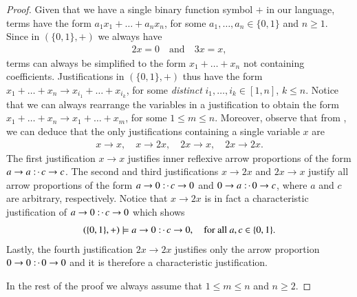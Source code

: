 \documentclass[11pt]{amsart}
\theoremstyle{definition} %
\newcommand{\righttherefore}{:\joinrel\cdot\,}
\begin{document}
\begin{proof} Given that we have a single binary function symbol $+$ in our language, terms have the form $a_1x_1+\ldots+a_nx_n$, for some $a_1,\ldots,a_n\in\{0,1\}$ and $n\geq 1$. Since in $(\{0,1\},+)$ we always have
\begin{align}\label{equ:2x=0_3x=x} 
	2x=0 \quad\text{and}\quad 3x=x,
\end{align} terms can always be simplified to the form $x_1+\ldots+x_n$ not containing coefficients. Justifications in $(\{0,1\},+)$ thus have the form $x_1+\ldots+x_n\to x_{i_1}+\ldots+x_{i_k}$, for some \textit{distinct} $i_1,\ldots,i_k\in [1,n]$, $k\leq n$. Notice that we can always rearrange the variables in a justification to obtain the form $x_1+\ldots+x_n\to x_1+\ldots+x_m$, for some $1\leq m\leq n$. Moreover, observe that from , we can deduce that the only justifications containing a single variable $x$ are 
\begin{align}\label{equ:x_to_x_x_to_2x_}
	x\to x,\quad x\to 2x,\quad 2x\to x,\quad 2x\to 2x.
\end{align} The first justification $x\to x$ justifies inner reflexive arrow proportions of the form $a\to a \righttherefore c\to c$. The second and third justifications $x\to 2x$ and $2x\to x$ justify all arrow proportions of the form $a\to 0 \righttherefore c\to 0$ and $0\to a \righttherefore 0\to c$, where $a$ and $c$ are arbitrary, respectively. Notice that $x\to 2x$ is in fact a characteristic justification of $a\to 0 \righttherefore c\to 0$ which shows
\begin{align}\label{euq:y_+_models_a->0>c->0} 
	(\{0,1\},+)\models a\to 0 \righttherefore c\to 0,\quad\text{for all $a,c\in\{0,1\}$}.
\end{align} Lastly, the fourth justification $2x\to 2x$ justifies only the arrow proportion $0\to 0 \righttherefore 0\to 0$ and it is therefore a characteristic justification.

In the rest of the proof we always assume that $1\leq m\leq n$ and $n\geq 2$.


\end{proof}
\end{document}
